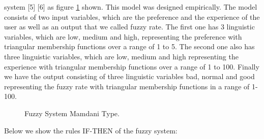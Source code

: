 system [5] [6] as figure \ref{fig:fis01} shown. This model was designed empirically. %
The model consists of two input variables, which are the preference and the
experience of the user as well as an output that we called fuzzy rate. The first
one has 3 linguistic variables, which are low, medium and high, representing the
preference with triangular membership functions over a range of 1 to 5. The
second one also has three linguistic variables, which are low, medium and high
representing the experience with triangular membership functions over a range of
1 to 100. Finally we have the output consisting of three linguistic variables
bad, normal and good representing the fuzzy rate with triangular membership
functions in a range of 1-100.

\begin{figure}
\captionsetup{justification=centering,margin=2cm}
\centering
\setlength\fboxsep{0pt}
\setlength\fboxrule{0.7pt}
\caption{Fuzzy System Mamdani Type.}
\label{fig:fis01}
\end{figure}

Below we show the rules IF-THEN of the fuzzy system:

